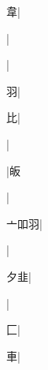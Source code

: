 \begin{multicols}{2}
{{\cjk{}{\cnsym{}　}{\cnsym{}　}韋}|{}\par
{}|{}\par
{\cjk{}{\cnsym{}　}{\cnsym{}　}{\cnsym{}　}}|{}\par
{\cjk{}{\cnsym{}　}{\cnsym{}　}羽}|{}\par
{\cjk{}{\cnsym{}　}{\cnsym{}　}比}|{}\par
{\cjk{}{\cnsym{}　}{\cnsym{}　}{\cnsym{}　}}|{}\par
{\cjk{}{\cnsym{}　}{\cnsym{}　}{\cnsym{}　}}|{\cjk{}皈}\par
{\cjk{}{\cnsym{}　}{\cnsym{}　}{\cnsym{}　}}|{}\par
{\cjk{}亠吅羽}|{}\par
{\cjk{}{\cnsym{}　}{\cnsym{}　}{\cnsym{}　}}|{}\par
{\cjk{}{\cnsym{}　}夕韭}|{}\par
{\cjk{}{\cnsym{}　}{\cnsym{}　}{\cnsym{}　}}|{}\par
{\cjk{}{\cnsym{}　}{\cnsym{}　}匚}|{}\par
{\cjk{}{\cnsym{}　}{\cnsym{}　}車}|{}\par
}
\end{multicols}
